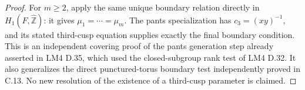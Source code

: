 \documentclass[11pt]{article}
\begin{document}
\begin{proof}
For $m\geq2$, apply the same unique boundary relation directly in $H_1(F,\widehat{\mathbb Z})$: it gives $\mu_1=\cdots=\mu_m$. The pants specialization has $c_3=(xy)^{-1}$, and its stated third-cusp equation supplies exactly the final boundary condition. This is an independent covering proof of the pants generation step already asserted in LM4 D.35, which used the closed-subgroup rank test of LM4 D.32. It also generalizes the direct punctured-torus boundary test independently proved in C.13. No new resolution of the existence of a third-cusp parameter is claimed.
\end{proof}
\end{document}

